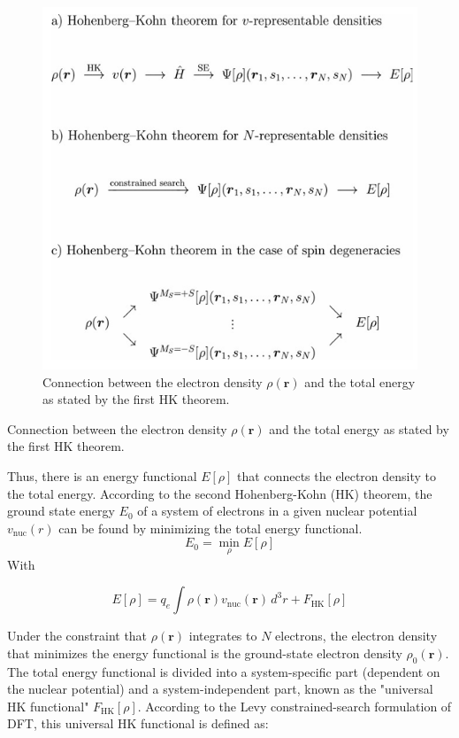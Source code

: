 \documentclass[%
 preprint, linenumbers,
 amsmath,amssymb,
 aps, physrev,
]{revtex4-2}
\begin{document}
\begin{figure}[H]
    \centering
    \includegraphics[width=0.6\linewidth]{image.png}
    \caption{Connection between the electron density \( \rho(\mathbf{r})\) and the total
 energy as stated by the first HK theorem.}
    \label{fig:enter-label}
\end{figure}



Connection between the electron density \( \rho(\mathbf{r})\) and the total
 energy as stated by the first HK theorem.


Thus, there is an energy functional \( E[\rho] \) that connects the electron density to the total energy. According to the second Hohenberg-Kohn (HK) theorem, the ground state energy \( E_0 \) of a system of electrons in a given nuclear potential \( v_{\text{nuc}}(r) \) can be found by minimizing the total energy functional.
\begin{equation}
     E_0 = \min_\rho E[\rho] 
\end{equation}
With

 \begin{equation}
     E[\rho] = q_e \int \rho(\mathbf{r}) v_{\text{nuc}}(\mathbf{r}) \, d^3r + F_{\text{HK}}[\rho] 
 \end{equation}


Under the constraint that \( \rho(\mathbf{r}) \) integrates to \( N \) electrons, the electron density that minimizes the energy functional is the ground-state electron density \( \rho_0(\mathbf{r}) \). The total energy functional is divided into a system-specific part (dependent on the nuclear potential) and a system-independent part, known as the "universal HK functional" \( F_{\text{HK}}[\rho] \). According to the Levy constrained-search formulation of DFT, this universal HK functional is defined as:
\end{document}
